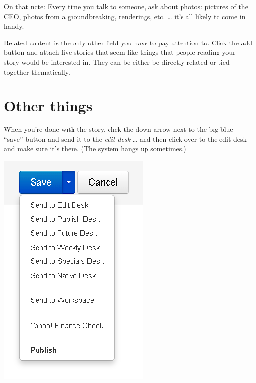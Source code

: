\documentclass[
  11pt,
  american,
  letterpaperpaper,
  extrafontsizes,onecolumn,openright
  ]{memoir}
\begin{document}
On that note: Every time you talk to someone, ask about photos: pictures of the CEO, photos from a groundbreaking, renderings, etc. \ldots{} it's all likely to come in handy.

Related content is the only other field you have to pay attention to. Click the add button and attach five stories that seem like things that people reading your story would be interested in. They can be either be directly related or tied together thematically.

\newpage

\hypertarget{other-things}{%
\section*{Other things}\label{other-things}}

When you're done with the story, click the down arrow next to the big blue \enquote{save} button and send it to the \emph{edit desk} \ldots{} and then click over to the edit desk and make sure it's there. (The system hangs up sometimes.)

\scriptsize

\begin{center}\includegraphics[width=0.6\linewidth]{images/send-to-edit} \end{center}

\normalsize
\end{document}
